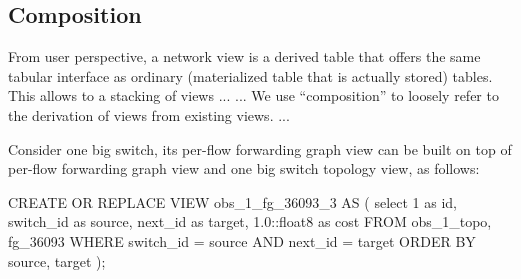 







\subsection{Composition}
\label{subsec:compose}


From user perspective, a network view is a derived table that offers
the same tabular interface as ordinary (\ie materialized table that is
actually stored) tables. This allows to a stacking of views ...  ...
We use ``composition'' to loosely refer to the derivation of views
from existing views. ...

Consider one big switch, its per-flow forwarding graph view can be
built on top of per-flow forwarding graph view and one big switch
topology view, as follows:
\begin{sql}
CREATE OR REPLACE VIEW obs_1_fg_36093_3 AS (
       select 1 as id,
       	      switch_id as source,
	      next_id as target,
	      1.0::float8 as cost
       FROM obs_1_topo, fg_36093
       WHERE switch_id = source AND next_id = target
       ORDER BY source, target
);
\end{sql}

